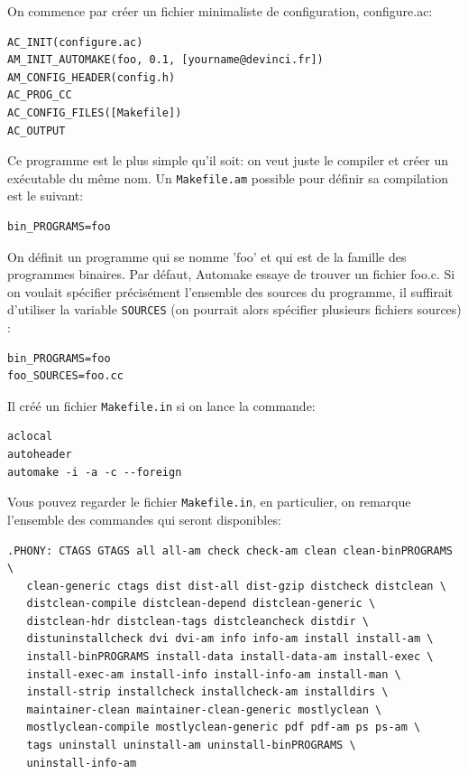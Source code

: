 \documentclass[11pt,a4paper]{article}
\begin{document}
On commence par créer un fichier minimaliste de configuration,
configure.ac: {\small
\begin{verbatim}
AC_INIT(configure.ac)
AM_INIT_AUTOMAKE(foo, 0.1, [yourname@devinci.fr])
AM_CONFIG_HEADER(config.h)
AC_PROG_CC
AC_CONFIG_FILES([Makefile])
AC_OUTPUT
\end{verbatim}
} Ce programme est le plus simple qu'il soit: on veut juste le
compiler et créer un exécutable du même nom. Un \texttt{Makefile.am}
possible pour définir sa compilation est le suivant:

{\small
\begin{verbatim}
bin_PROGRAMS=foo
\end{verbatim}
}

On définit un programme qui se nomme 'foo' et qui est de la famille
des programmes binaires. Par défaut, Automake essaye de trouver un
fichier foo.c. Si on voulait spécifier précisément l'ensemble des
sources du programme, il suffirait d'utiliser la variable
\texttt{SOURCES} (on pourrait alors spécifier plusieurs fichiers
sources) :

{\small
\begin{verbatim}
bin_PROGRAMS=foo
foo_SOURCES=foo.cc
\end{verbatim}
}

Il créé un fichier \texttt{Makefile.in} si on lance la commande:

{\small
\begin{verbatim}
aclocal
autoheader
automake -i -a -c --foreign
\end{verbatim}
}

Vous pouvez regarder le fichier \texttt{Makefile.in}, en particulier,
on remarque l'ensemble des commandes qui seront disponibles:

{\small
\begin{verbatim}
.PHONY: CTAGS GTAGS all all-am check check-am clean clean-binPROGRAMS \
   clean-generic ctags dist dist-all dist-gzip distcheck distclean \
   distclean-compile distclean-depend distclean-generic \
   distclean-hdr distclean-tags distcleancheck distdir \
   distuninstallcheck dvi dvi-am info info-am install install-am \
   install-binPROGRAMS install-data install-data-am install-exec \
   install-exec-am install-info install-info-am install-man \
   install-strip installcheck installcheck-am installdirs \
   maintainer-clean maintainer-clean-generic mostlyclean \
   mostlyclean-compile mostlyclean-generic pdf pdf-am ps ps-am \
   tags uninstall uninstall-am uninstall-binPROGRAMS \
   uninstall-info-am
\end{verbatim}
}
\end{document}

